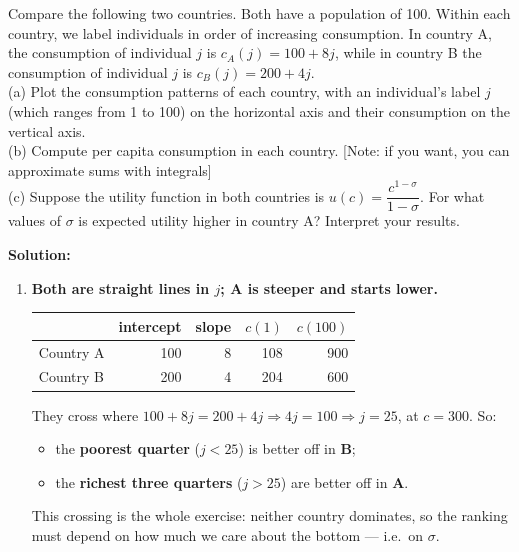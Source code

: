 \documentclass[12pt, letterpaper]{article}
\begin{document}
\begin{tcolorbox}[evenbox,title={Problem 2.8 \quad Inequality and Risk Aversion}]
\begin{tcolorbox}[questionbox]
Compare the following two countries. Both have a population of 100. Within each country, we
label individuals in order of increasing consumption. In country A, the consumption of
individual $j$ is $c_A(j) = 100 + 8j$, while in country B the consumption of individual $j$
is $c_B(j) = 200 + 4j$.\\[3pt]
(a) Plot the consumption patterns of each country, with an individual's label $j$ (which
ranges from 1 to 100) on the horizontal axis and their consumption on the vertical axis.\\
(b) Compute per capita consumption in each country. [Note: if you want, you can approximate
sums with integrals]\\
(c) Suppose the utility function in both countries is $u(c) = \dfrac{c^{1-\sigma}}{1-\sigma}$.
For what values of $\sigma$ is expected utility higher in country A? Interpret your results.
\end{tcolorbox}

\textbf{Solution:}

\begin{enumerate}

\item \textbf{Both are straight lines in $j$; A is steeper and starts lower.}

\begin{center}
\begin{tabular}{lrrrr}
\toprule
& intercept & slope & $c(1)$ & $c(100)$ \\
\midrule
Country A & 100 & 8 & 108 & 900 \\
Country B & 200 & 4 & 204 & 600 \\
\bottomrule
\end{tabular}
\end{center}

They cross where $100+8j = 200+4j \Rightarrow 4j = 100 \Rightarrow j = 25$, at
$c = 300$. So:
\begin{itemize}[leftmargin=1.3em,itemsep=2pt,topsep=2pt]
\item the \textbf{poorest quarter} ($j < 25$) is better off in \textbf{B};
\item the \textbf{richest three quarters} ($j > 25$) are better off in \textbf{A}.
\end{itemize}
This crossing is the whole exercise: neither country dominates, so the ranking must depend on
how much we care about the bottom --- i.e.\ on $\sigma$.


\end{enumerate}
\end{tcolorbox}
\end{document}
